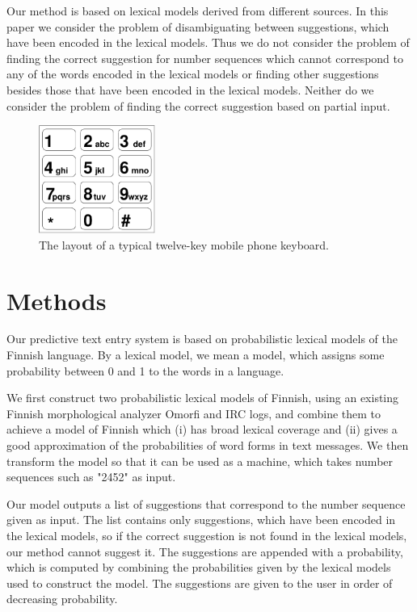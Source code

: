 \documentclass[a4paper,conference]{IEEEtran}
\begin{document}
Our method is based on lexical models derived from different
sources. In this paper we consider the problem of disambiguating
between suggestions, which have been encoded in the lexical
models. Thus we do not consider the problem of finding the correct
suggestion for number sequences which cannot correspond to any of the
words encoded in the lexical models or finding other suggestions besides
those that have been encoded in the lexical models. Neither do we
consider the problem of finding the correct suggestion based on
partial input.

\begin{figure}
\begin{center}
\includegraphics[width=1.5in]{keypad.pdf}
\end{center}
\caption{The layout of a typical twelve-key mobile phone keyboard.}
\label{fig:keypad}
\end{figure}

\section{Methods}
\label{sec:methods}

Our predictive text entry system is based on probabilistic lexical
models of the Finnish language. By a lexical model, we mean a model,
which assigns some probability between 0 and 1 to the words in a
language.

We first construct two probabilistic lexical models of Finnish,
using an existing Finnish morphological analyzer Omorfi and IRC logs, and combine
them to achieve a model of Finnish which (i) has broad lexical
coverage and (ii) gives a good approximation of the probabilities of
word forms in text messages. We then transform the model so that it
can be used as a machine, which takes number sequences such as "2452"
as input. 

Our model outputs a list of suggestions that correspond to the number
sequence given as input. The list contains only suggestions, which
have been encoded in the lexical models, so if the correct suggestion
is not found in the lexical models, our method cannot suggest it. The
suggestions are appended with a probability, which is computed by
combining the probabilities given by the lexical models used to
construct the model. The suggestions are given to the user in order of
decreasing probability.
\end{document}
